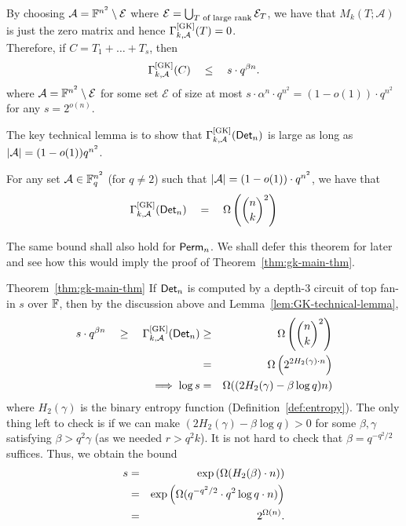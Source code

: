  By choosing $\mathcal{A} = \mathbb{F}^{n^2} \setminus \mathcal{E}$ where $\mathcal{E} = \bigcup_{\text{$T$ of large rank}} \mathcal{E}_T$, we have that $M_k(T;\mathcal{A})$ is just the zero matrix and hence
 $\Gamma^{\mathrm{[GK]}}_{k,\mathcal{A}}(T) = 0$.\\


Therefore, if $C = T_1 + \dots + T_s$, then 
\begin{equation}\label{eqn:gk-upper-bound-circuit}
\Gamma^{\mathrm{[GK]}}_{k,\mathcal{A}}(C) \quad \leq \quad s \cdot
q^{\beta n}.
\end{equation} 
where $\mathcal{A} = \mathbb{F}^{n^2} \setminus \mathcal{E}$ for some set $\mathcal{E}$ of size at most $s \cdot \alpha^n \cdot  q^{n^2} = (1 - o(1)) \cdot q^{n^2}$ for any $s = 2^{o(n)}$.

The key technical lemma is to show that $\Gamma^{\mathrm{[GK]}}_{k,\mathcal{A}}(\mathsf{Det}_n)$ is large as long as $\left|\mathcal{A}\right| = (1 - o(1)) q^{n^2}$. 

\begin{lemma}\label{lem:GK-technical-lemma}
For any set $\mathcal{A} \in \mathbb{F}_q^{n^2}$ (for $q\neq 2$) such that $\left|\mathcal{A}\right| =  (1 - o(1)) \cdot q^{n^2}$, we have that 
\[
\Gamma^{\mathrm{[GK]}}_{k,\mathcal{A}}(\mathsf{Det}_n) \quad = \quad \Omega\left(\binom{n}{k}^2\right)
\]
\end{lemma}

The same bound shall also hold for $\mathsf{Perm}_n$. We shall defer this theorem for later and see how this would imply the proof of Theorem~\ref{thm:gk-main-thm}. 

\begin{proofof}{Theorem~\ref{thm:gk-main-thm}}
If $\mathsf{Det}_n$ is computed by a depth-3 circuit of top fan-in $s$ over $\mathbb{F}$, then by the discussion above and Lemma~\ref{lem:GK-technical-lemma},
\begin{eqnarray*}
s \cdot q^{\beta n} \quad \geq \quad \Gamma^{\mathrm{[GK]}}_{k,\mathcal{A}}(\mathsf{Det}_n) & \geq &    \Omega\left(\binom{n}{k}^2\right)\\
 & = & \Omega\left(2^{2H_2(\gamma)\cdot n}\right)\\
\implies \log s & = & \Omega((2H_2(\gamma) - \beta \log q)n)
\end{eqnarray*}
where $H_2(\gamma)$ is the binary entropy function (Definition~\ref{def:entropy}). The only thing left to check is if we can make $(2H_2(\gamma) - \beta \log q) > 0$ for some $\beta,\gamma$ satisfying $\beta > q^2 \gamma$ (as we needed $r > q^2 k$). It is not hard to check that $\beta = q^{-q^2/2}$ suffices. Thus, we obtain the bound
\begin{eqnarray*}
  s &=&  \exp\left(\Omega(H_2(\beta)\cdot n)\right) \\
    &=&  \exp\left(\Omega(q^{-q^2/2} \cdot q^2 \log q \cdot n)\right)\\
  & =& 2^{\Omega(n)}.
\end{eqnarray*}
\end{proofof}


